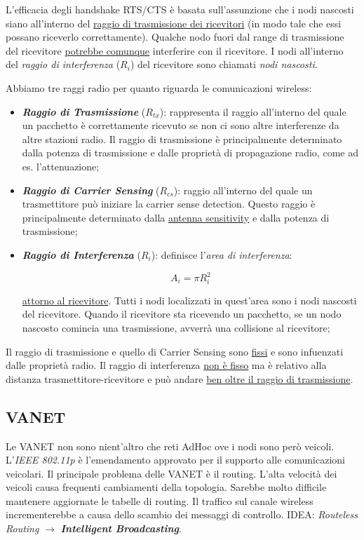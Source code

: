 L'efficacia degli handshake RTS/CTS è basata sull'assunzione che i nodi nascosti siano all'interno del \underline{raggio di trasmissione dei ricevitori} (in modo tale che essi possano riceverlo correttamente). Qualche nodo fuori dal range di trasmissione del ricevitore \underline{potrebbe comunque} interferire con il ricevitore. I nodi all'interno del \textit{raggio di interferenza} ($R_i$) del ricevitore sono chiamati \textit{nodi nascosti}.

Abbiamo tre raggi radio per quanto riguarda le comunicazioni wireless:

\begin{itemize}

\item{\textit{\textbf{Raggio di Trasmissione}} ($R_{tx}$)}: rappresenta il raggio all'interno del quale un pacchetto è correttamente ricevuto se non ci sono altre interferenze da altre stazioni radio. Il raggio di trasmissione è principalmente determinato dalla potenza di trasmissione e dalle proprietà di propagazione radio, come ad es. l'attenuazione;
\item{\textit{\textbf{Raggio di Carrier Sensing}} ($R_{cs}$)}: raggio all'interno del quale un trasmettitore può iniziare la carrier sense detection. Questo raggio è principalmente determinato dalla \underline{antenna sensitivity} e dalla potenza di trasmissione;
\item{\textit{\textbf{Raggio di Interferenza}} ($R_i$)}: definisce l'\textit{area di interferenza}:

\[
	A_i = \pi R_i^2
\]

\underline{attorno al ricevitore}. Tutti i nodi localizzati in quest'area sono i nodi nascosti del ricevitore. Quando il ricevitore sta ricevendo un pacchetto, se un nodo nascosto comincia una trasmissione, avverrà una collisione al ricevitore;

\end{itemize}

Il raggio di trasmissione e quello di Carrier Sensing sono \underline{fissi} e sono infuenzati dalle proprietà radio. Il raggio di interferenza \underline{non è fisso} ma è relativo alla distanza trasmettitore-ricevitore e può andare \underline{ben oltre il raggio di trasmissione}.

\subsection{VANET}

Le VANET non sono nient'altro che reti AdHoc ove i nodi sono però veicoli. L'\textit{IEEE 802.11p} è l'emendamento approvato per il supporto alle comunicazioni veicolari. Il principale problema delle VANET è il routing. L'alta velocità dei veicoli causa frequenti cambiamenti della topologia. Sarebbe molto difficile mantenere aggiornate le tabelle di routing. Il traffico sul canale wireless incrementerebbe a causa dello scambio dei messaggi di controllo. IDEA: \textit{Routeless Routing} $\rightarrow$ \textit{\textbf{Intelligent Broadcasting}}.

